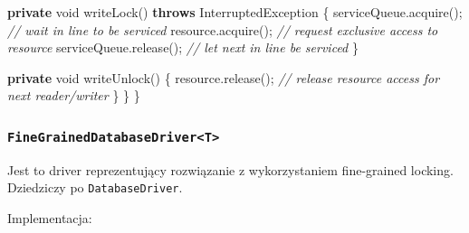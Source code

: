 \documentclass[11pt]{article}
\newenvironment{Shaded}{}{}
\newcommand{\KeywordTok}[1]{\textcolor[rgb]{0.00,0.44,0.13}{\textbf{{#1}}}}
\newcommand{\DataTypeTok}[1]{\textcolor[rgb]{0.56,0.13,0.00}{{#1}}}
\newcommand{\CommentTok}[1]{\textcolor[rgb]{0.38,0.63,0.69}{\textit{{#1}}}}
\newcommand{\FunctionTok}[1]{\textcolor[rgb]{0.02,0.16,0.49}{{#1}}}
\newcommand{\NormalTok}[1]{{#1}}
\newcommand{\OperatorTok}[1]{\textcolor[rgb]{0.40,0.40,0.40}{{#1}}}
\newcommand{\BuiltInTok}[1]{{#1}}
\begin{document}
\begin{Shaded}
\begin{Highlighting}[]
        \KeywordTok{private} \DataTypeTok{void} \FunctionTok{writeLock}\OperatorTok{()} \KeywordTok{throws} \BuiltInTok{InterruptedException} \OperatorTok{\{}
\NormalTok{            serviceQueue}\OperatorTok{.}\FunctionTok{acquire}\OperatorTok{();} \CommentTok{// wait in line to be serviced}
\NormalTok{            resource}\OperatorTok{.}\FunctionTok{acquire}\OperatorTok{();}     \CommentTok{// request exclusive access to resource}
\NormalTok{            serviceQueue}\OperatorTok{.}\FunctionTok{release}\OperatorTok{();} \CommentTok{// let next in line be serviced}
        \OperatorTok{\}}

        \KeywordTok{private} \DataTypeTok{void} \FunctionTok{writeUnlock}\OperatorTok{()} \OperatorTok{\{}
\NormalTok{            resource}\OperatorTok{.}\FunctionTok{release}\OperatorTok{();} \CommentTok{// release resource access for next reader/writer}
        \OperatorTok{\}}
    \OperatorTok{\}}
\OperatorTok{\}}
\end{Highlighting}
\end{Shaded}

    \hypertarget{finegraineddatabasedrivert}{%
\subsubsection{\texorpdfstring{\texttt{FineGrainedDatabaseDriver\textless{}T\textgreater{}}}{FineGrainedDatabaseDriver\textless T\textgreater{}}}\label{finegraineddatabasedrivert}}

Jest to driver reprezentujący rozwiązanie z wykorzystaniem fine-grained
locking. Dziedziczy po \texttt{DatabaseDriver}.

Implementacja:
\end{document}

